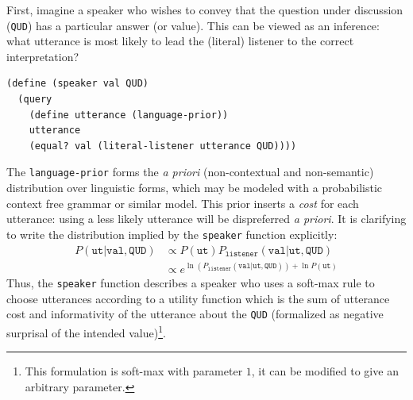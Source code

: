 \documentclass[12pt]{article}
\begin{document}
First, imagine a speaker who wishes to convey that the question under discussion (\lstinline{QUD}) has a particular answer (or value). This can be viewed as an inference: what utterance is most likely to lead the (literal) listener to the correct interpretation?
\begin{lstlisting}
(define (speaker val QUD)
  (query
    (define utterance (language-prior))
    utterance
    (equal? val (literal-listener utterance QUD))))
\end{lstlisting}
The \lstinline{language-prior} forms the \emph{a priori} (non-contextual and non-semantic) distribution over linguistic forms, which may be modeled with a probabilistic context free grammar or similar model. 
This prior inserts a \emph{cost} for each utterance: using a less likely utterance will be dispreferred \emph{a priori}.
It is clarifying to write the distribution implied by the \lstinline{speaker} function explicitly:
\begin{align}
P(\texttt{ut} | \texttt{val}, \texttt{QUD}) &\propto P(\texttt{ut}) P_{\texttt{listener}}(\texttt{val} | \texttt{ut}, \texttt{QUD}) \\
&\propto e^{\ln(P_{\texttt{listener}}(\texttt{val} | \texttt{ut}, \texttt{QUD})) + \ln{P(\texttt{ut})}}
\end{align}
Thus, the \lstinline{speaker} function describes a speaker who uses a soft-max rule \cite{luce59,suttonbarto98} to choose utterances according to a utility function which is the sum of utterance cost and informativity of the utterance about the \lstinline{QUD} (formalized as negative surprisal of the intended value)\footnote{This formulation is soft-max with parameter $1$, it can be modified to give an arbitrary parameter.}.
\end{document}
